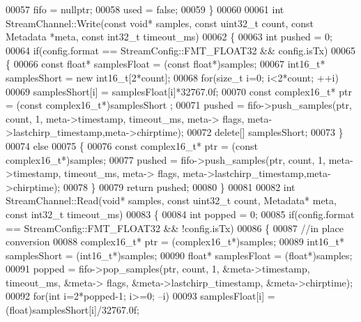 \begin{DoxyCode}
00057     fifo = \textcolor{keyword}{nullptr};
00058     used = \textcolor{keyword}{false};
00059 \}
00060 
00061 \textcolor{keywordtype}{int} StreamChannel::Write(\textcolor{keyword}{const} \textcolor{keywordtype}{void}* samples, \textcolor{keyword}{const} uint32\_t count, \textcolor{keyword}{const} 
      Metadata *meta, \textcolor{keyword}{const} int32\_t timeout_ms)
00062 \{
00063     \textcolor{keywordtype}{int} pushed = 0;
00064     \textcolor{keywordflow}{if}(config.format == StreamConfig::FMT_FLOAT32 && config.isTx)
00065     \{
00066         \textcolor{keyword}{const} \textcolor{keywordtype}{float}* samplesFloat = (\textcolor{keyword}{const} \textcolor{keywordtype}{float}*)samples;
00067         int16\_t* samplesShort = \textcolor{keyword}{new} int16\_t[2*count];
00068         \textcolor{keywordflow}{for}(\textcolor{keywordtype}{size\_t} i=0; i<2*count; ++i)
00069             samplesShort[i] = samplesFloat[i]*32767.0f;
00070         \textcolor{keyword}{const} complex16_t* ptr = (\textcolor{keyword}{const} complex16_t*)samplesShort ;
00071         pushed = fifo->push_samples(ptr, count, 1, meta->timestamp, timeout\_ms, meta->
      flags, meta->lastchirp_timestamp,meta->chirptime);
00072         \textcolor{keyword}{delete}[] samplesShort;
00073     \}
00074     \textcolor{keywordflow}{else}
00075     \{
00076         \textcolor{keyword}{const} complex16_t* ptr = (\textcolor{keyword}{const} complex16_t*)samples;
00077         pushed = fifo->push_samples(ptr, count, 1, meta->timestamp, timeout\_ms, meta->
      flags, meta->lastchirp_timestamp,meta->chirptime);
00078     \}
00079     \textcolor{keywordflow}{return} pushed;
00080 \}
00081 
00082 \textcolor{keywordtype}{int} StreamChannel::Read(\textcolor{keywordtype}{void}* samples, \textcolor{keyword}{const} uint32\_t count, Metadata* meta, \textcolor{keyword}{const} int32\_t 
      timeout_ms)
00083 \{
00084     \textcolor{keywordtype}{int} popped = 0;
00085     \textcolor{keywordflow}{if}(config.format == StreamConfig::FMT_FLOAT32 && !config.isTx)
00086     \{
00087         \textcolor{comment}{//in place conversion}
00088         complex16_t* ptr = (complex16_t*)samples;
00089         int16\_t* samplesShort = (int16\_t*)samples;
00090         \textcolor{keywordtype}{float}* samplesFloat = (\textcolor{keywordtype}{float}*)samples;
00091         popped = fifo->pop_samples(ptr, count, 1, &meta->timestamp, timeout\_ms, &meta->
      flags, &meta->lastchirp_timestamp, &meta->chirptime);
00092         \textcolor{keywordflow}{for}(\textcolor{keywordtype}{int} i=2*popped-1; i>=0; --i)
00093             samplesFloat[i] = (\textcolor{keywordtype}{float})samplesShort[i]/32767.0f;

\end{DoxyCode}
